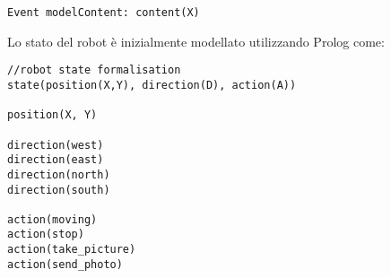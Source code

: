 \begin{lstlisting}
Event modelContent: content(X)

\end{lstlisting}


Lo stato del robot è inizialmente modellato utilizzando Prolog come:

\begin{lstlisting}
//robot state formalisation
state(position(X,Y), direction(D), action(A))

position(X, Y)

direction(west)
direction(east)
direction(north)
direction(south)

action(moving)
action(stop)
action(take_picture)
action(send_photo)

\end{lstlisting}